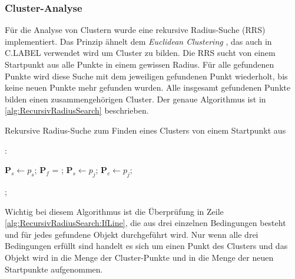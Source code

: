 \subsubsection{Cluster-Analyse}

Für die Analyse von Clustern wurde eine rekursive Radius-Suche (RRS) implementiert. Das Prinzip ähnelt dem \textit{Euclidean Clustering} \cite{bib:EuclideanCluster}, das auch in C.LABEL verwendet wird um Cluster zu bilden. Die RRS sucht von einem Startpunkt aus alle Punkte in einem gewissen Radius. Für alle gefundenen Punkte wird diese Suche mit dem jeweiligen gefundenen Punkt wiederholt, bis keine neuen Punkte mehr gefunden wurden. Alle insgesamt gefundenen Punkte bilden einen zusammengehörigen Cluster. Der genaue Algorithmus ist in \ref{alg:RecursivRadiusSearch} beschrieben.

\begin{algorithm}
  \caption{Rekursive Radius-Suche zum Finden eines Clusters von einem Startpunkt aus}
\label{alg:RecursivRadiusSearch}
  \begin{algorithmic}[1]
  	\State {}:
   	
	\State $\textbf{P}_{s} \gets p_s$;   	
    	\State $\textbf{P}_{f}$ = ;
			 \label{alg:RecursivRadiusSearch:IfLine}
				\State $\textbf{P}_s \gets p_j$;
				\State $\textbf{P}_c \gets p_j$;
			\EndIf
		 \EndFor
	\EndFor
	
		\State {};
	\EndIf
  \end{algorithmic}
\end{algorithm}

Wichtig bei diesem Algorithmus ist die Überprüfung in Zeile \ref{alg:RecursivRadiusSearch:IfLine}, die aus drei einzelnen Bedingungen besteht und für jedes gefundene Objekt durchgeführt wird. Nur wenn alle drei Bedingungen erfüllt sind handelt es sich um einen Punkt des Clusters und das Objekt wird in die Menge der Cluster-Punkte und in die Menge der neuen Startpunkte aufgenommen. \\

